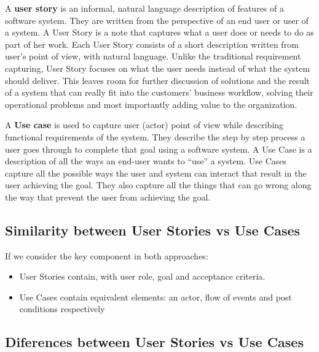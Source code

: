 \documentclass[
]{book}
\begin{document}
A \textbf{user story} is an informal, natural language description of features of a software system. They are written from the perspective of an end user or user of a system. A User Story is a note that captures what a user does or needs to do as part of her work. Each User Story consists of a short description written from user's point of view, with natural language. Unlike the traditional requirement capturing, User Story focuses on what the user needs instead of what the system should deliver. This leaves room for further discussion of solutions and the result of a system that can really fit into the customers' business workflow, solving their operational problems and most importantly adding value to the organization.

A \textbf{Use case} is used to capture user (actor) point of view while describing functional requirements of the system. They describe the step by step process a user goes through to complete that goal using a software system. A Use Case is a description of all the ways an end-user wants to ``use'' a system. Use Cases capture all the possible ways the user and system can interact that result in the user achieving the goal. They also capture all the things that can go wrong along the way that prevent the user from achieving the goal.

\hypertarget{similarity-between-user-stories-vs-use-cases}{%
\subsection{Similarity between User Stories vs Use Cases}\label{similarity-between-user-stories-vs-use-cases}}

If we consider the key component in both approaches:

\begin{itemize}
\item
  User Stories contain, with user role, goal and acceptance criteria.
\item
  Use Cases contain equivalent elements: an actor, flow of events and post conditions respectively
\end{itemize}

\hypertarget{diferences-between-user-stories-vs-use-cases}{%
\subsection{Diferences between User Stories vs Use Cases}\label{diferences-between-user-stories-vs-use-cases}}
\end{document}
